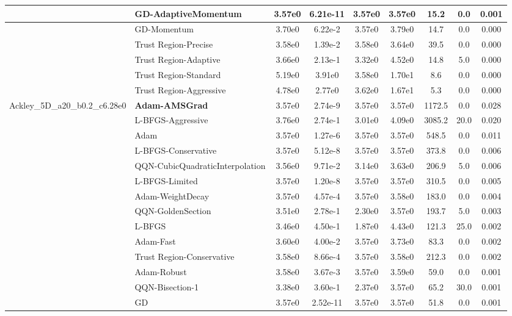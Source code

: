 \documentclass[10pt]{article}
\begin{document}
\begin{longtable}{|l|l|c|c|c|c|c|c|c|}
\hline
 & GD-AdaptiveMomentum & 3.57e0 & 6.21e-11 & 3.57e0 & 3.57e0 & 15.2 & 0.0 & 0.001 \\
\hline
 & GD-Momentum & 3.70e0 & 6.22e-2 & 3.57e0 & 3.79e0 & 14.7 & 0.0 & 0.000 \\
\hline
 & Trust Region-Precise & 3.58e0 & 1.39e-2 & 3.58e0 & 3.64e0 & 39.5 & 0.0 & 0.000 \\
\hline
 & Trust Region-Adaptive & 3.66e0 & 2.13e-1 & 3.32e0 & 4.52e0 & 14.8 & 5.0 & 0.000 \\
\hline
 & Trust Region-Standard & 5.19e0 & 3.91e0 & 3.58e0 & 1.70e1 & 8.6 & 0.0 & 0.000 \\
\hline
 & Trust Region-Aggressive & 4.78e0 & 2.77e0 & 3.62e0 & 1.67e1 & 5.3 & 0.0 & 0.000 \\
Ackley\_5D\_a20\_b0.2\_c6.28e0 & \textbf{Adam-AMSGrad} & 3.57e0 & 2.74e-9 & 3.57e0 & 3.57e0 & 1172.5 & 0.0 & 0.028 \\
\hline
 & L-BFGS-Aggressive & 3.76e0 & 2.74e-1 & 3.01e0 & 4.09e0 & 3085.2 & 20.0 & 0.020 \\
\hline
 & Adam & 3.57e0 & 1.27e-6 & 3.57e0 & 3.57e0 & 548.5 & 0.0 & 0.011 \\
\hline
 & L-BFGS-Conservative & 3.57e0 & 5.12e-8 & 3.57e0 & 3.57e0 & 373.8 & 0.0 & 0.006 \\
\hline
 & QQN-CubicQuadraticInterpolation & 3.56e0 & 9.71e-2 & 3.14e0 & 3.63e0 & 206.9 & 5.0 & 0.006 \\
\hline
 & L-BFGS-Limited & 3.57e0 & 1.20e-8 & 3.57e0 & 3.57e0 & 310.5 & 0.0 & 0.005 \\
\hline
 & Adam-WeightDecay & 3.57e0 & 4.57e-4 & 3.57e0 & 3.58e0 & 183.0 & 0.0 & 0.004 \\
\hline
 & QQN-GoldenSection & 3.51e0 & 2.78e-1 & 2.30e0 & 3.57e0 & 193.7 & 5.0 & 0.003 \\
\hline
 & L-BFGS & 3.46e0 & 4.50e-1 & 1.87e0 & 4.43e0 & 121.3 & 25.0 & 0.002 \\
\hline
 & Adam-Fast & 3.60e0 & 4.00e-2 & 3.57e0 & 3.73e0 & 83.3 & 0.0 & 0.002 \\
\hline
 & Trust Region-Conservative & 3.58e0 & 8.66e-4 & 3.57e0 & 3.58e0 & 212.3 & 0.0 & 0.002 \\
\hline
 & Adam-Robust & 3.58e0 & 3.67e-3 & 3.57e0 & 3.59e0 & 59.0 & 0.0 & 0.001 \\
\hline
 & QQN-Bisection-1 & 3.38e0 & 3.60e-1 & 2.37e0 & 3.57e0 & 65.2 & 30.0 & 0.001 \\
\hline
 & GD & 3.57e0 & 2.52e-11 & 3.57e0 & 3.57e0 & 51.8 & 0.0 & 0.001 \\
\hline

\end{longtable}
\end{document}
